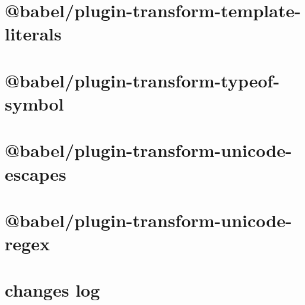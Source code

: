 \documentclass[twoside]{book}
\newcommand{\+}{\discretionary{\mbox{\scriptsize$\hookleftarrow$}}{}{}}
\begin{document}
\chapter{@babel/plugin-\/transform-\/template-\/literals}
\label{md__c___users_vaishnavi_jadhav__desktop__developer_code_mean_stack_example_client_node_modules__26e5356a39dc1155367596f3572b699d}

\chapter{@babel/plugin-\/transform-\/typeof-\/symbol}
\label{md__c___users_vaishnavi_jadhav__desktop__developer_code_mean_stack_example_client_node_modules__45e8fad8577090bff142fe68d009d460}

\chapter{@babel/plugin-\/transform-\/unicode-\/escapes}
\label{md__c___users_vaishnavi_jadhav__desktop__developer_code_mean_stack_example_client_node_modules__30ada5e1244ae6dee97c449ecac07f5a}

\chapter{@babel/plugin-\/transform-\/unicode-\/regex}
\label{md__c___users_vaishnavi_jadhav__desktop__developer_code_mean_stack_example_client_node_modules__d8cc4f410681a6dfef94ee318dc14f84}

\chapter{changes log}
\label{md__c___users_vaishnavi_jadhav__desktop__developer_code_mean_stack_example_client_node_modules__5d7b04e817e9f711246c0f99bf7d3d48}

\end{document}
